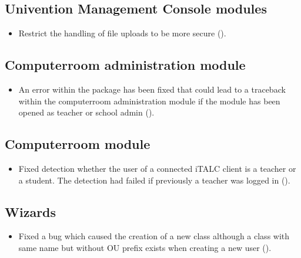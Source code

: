 
\subsection{Univention Management Console modules}
\begin{itemize}
\item Restrict the handling of file uploads to be more secure ().
\end{itemize}


\subsection{Computerroom administration module}
\begin{itemize}
\item An error within the package  has been fixed that could lead to a traceback
  within the computerroom administration module if the module has been opened as teacher or school admin ().
\end{itemize}

\subsection{Computerroom module}
\begin{itemize}
\item Fixed detection whether the user of a connected iTALC client is a teacher or a student. The detection had failed if previously a teacher was logged in ().
\end{itemize}

\subsection{Wizards}
\begin{itemize}
\item Fixed a bug which caused the creation of a new class although a class with same name but without OU prefix exists when creating a new user ().
\end{itemize}



